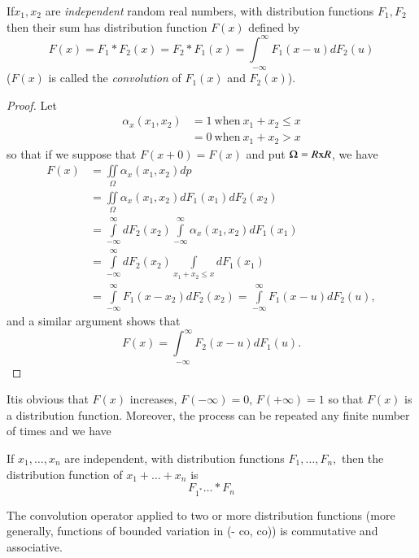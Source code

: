 \begin{theorem}\label{chap2:sec4:thm6} %
  If\pageoriginale $x_1, x_2$ are \textit{independent} random real numbers, with
  distribution functions $F_1, F_2$ then their sum has distribution
  function $F(x)$ defined by
  $$ 
  F(x) = F_1 \ast F_2 (x) = F_2 \ast F_1 (x) ={
  \underset{-\infty}{\int^\infty}}  F_1 (x - u) d F_2 (u)
  $$
  ($F(x)$ is called the \textit{convolution} of $F_1(x)$ and $F_2 (x)$).
\end{theorem}

\begin{proof}
  Let 
  \begin{align*}
    \alpha_x (x_1 , x_2)& =1 ~\text{when}~ x_1 + x_2 \leq x\\
    &= 0 ~\text{when}~ x_1 + x_2 > x 
  \end{align*}
  so that if we suppose that $F(x+ 0)= F (x)$ and put $\Omega= R {\rm
    x} R$, we have 
  \begin{align*}
    F(x) &= \iint\limits_{\Omega} \alpha_x (x_1 , x_2) d p\\
    &  = \iint\limits_{\Omega} \alpha_x (x_1 , x_2) dF_1 (x_1) dF_2 (x_2)\\
    &= \int\limits_{-\infty}^{\infty} d F_2 (x_2)
    \int\limits_{-\infty}^{\infty} \alpha_x (x_1 , x_2) dF_1
    (x_1)\\ 
    &= \int\limits_{-\infty}^{\infty} d F_2 (x_2) \int\limits_{x_1 + x_2
      \leq x } dF_1 (x_1)\\ 
    & = \int\limits_{-\infty}^{\infty} F_1 (x - x_2) d F_2 (x_2) =
    \int\limits_{-\infty}^{\infty} F_1 (x -u) d F_2 (u),
  \end{align*}
  and a similar argument shows that
  $$ 
  F(x)= {\underset{-\infty}{\int^\infty}} F_2 (x -u) dF_1 (u).
  $$
\end{proof}

It\pageoriginale is obvious that $F(x)$ increases, $F(-\infty) = 0$, $F(+\infty) =1$
so that $F(x)$ is a distribution function. Moreover, the process can be
repeated any finite number of times and we have 

\begin{theorem}\label{chap2:sec4:thm7}%
  If $x_1, \ldots , x_n $ are independent, with distribution functions
  $F_1 , \ldots , F_n,$ then the distribution function of $x_1 + \ldots +
  x_n $ is 
  $$F_{1^*} \ldots  \ast F_n $$
\end{theorem}

\begin{coro*}
  The convolution operator applied to two
  or more distribution functions (more generally, functions of bounded
  variation in (- co, co)) is commutative and associative.
\end{coro*}

